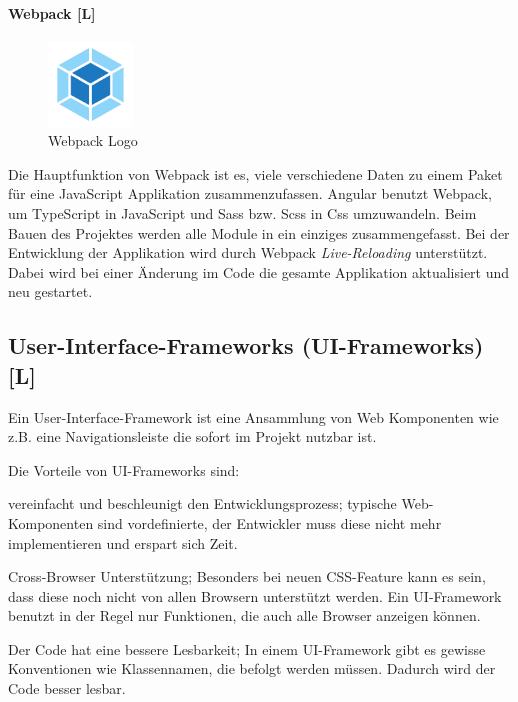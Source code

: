 \paragraph{Webpack [L]}
\begin{figure}
  \begin{center}
    \includegraphics[width=0.2\textwidth]{pics/webpack-logo.png}
   \caption{Webpack Logo}
  \end{center}
\end{figure}
Die Hauptfunktion von Webpack ist es, viele verschiedene Daten zu einem Paket für eine JavaScript Applikation zusammenzufassen.
Angular benutzt Webpack, um TypeScript in JavaScript und Sass bzw. Scss in Css umzuwandeln. Beim Bauen des Projektes werden alle Module in ein einziges zusammengefasst. Bei der Entwicklung der Applikation wird durch Webpack \emph{Live-Reloading} unterstützt. Dabei wird bei einer Änderung im Code die gesamte Applikation aktualisiert und neu gestartet. \cite{Webpack}

\subsection{User-Interface-Frameworks (UI-Frameworks) [L]}
Ein User-Interface-Framework ist eine Ansammlung von Web Komponenten wie z.B. eine Navigationsleiste die sofort im Projekt nutzbar ist.


Die Vorteile von UI-Frameworks sind:\cite{CssFrameworkExplaination, BestCSSFrameworksin2022}
\begin{compactitem}
    \item vereinfacht und beschleunigt den Entwicklungsprozess;
    typische Web-Komponenten sind vordefinierte, der Entwickler muss diese nicht mehr implementieren und erspart sich Zeit.
    \item Cross-Browser Unterstützung;
    Besonders bei neuen CSS-Feature kann es sein, dass diese noch nicht von allen Browsern unterstützt werden. Ein UI-Framework benutzt in der Regel nur Funktionen, die auch alle Browser anzeigen können.
    \item Der Code hat eine bessere Lesbarkeit;
    In einem UI-Framework gibt es gewisse Konventionen wie Klassennamen, die befolgt werden müssen. Dadurch wird der Code besser lesbar.
\end{compactitem}



